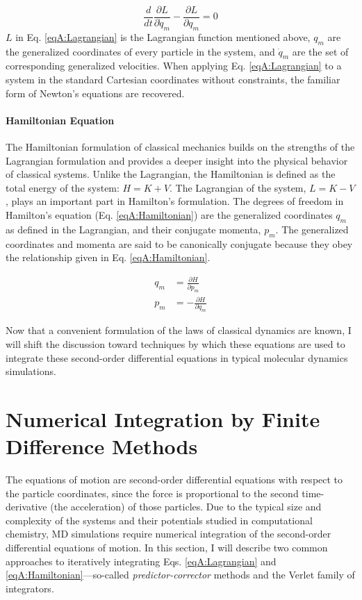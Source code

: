 \begin{equation}
   \frac d {dt} \frac {\partial L} {\partial \dot q_m} - \frac {\partial L}
         {\partial q_m} = 0
   \label{eqA:Lagrangian}
\end{equation}
$L$ in Eq. \ref{eqA:Lagrangian} is the Lagrangian function mentioned above,
$q_m$ are the generalized coordinates of every particle in the system, and $\dot
q_m$ are the set of corresponding generalized velocities. When applying Eq.
\ref{eqA:Lagrangian} to a system in the standard Cartesian coordinates without
constraints, the familiar form of Newton's equations are recovered.
\cite{CorbenClassicalMechanics}

\paragraph{Hamiltonian Equation}

The Hamiltonian formulation of classical mechanics builds on the strengths of
the Lagrangian formulation and provides a deeper insight into the physical
behavior of classical systems. Unlike the Lagrangian, the Hamiltonian is defined
as the total energy of the system: $H = K + V$. The Lagrangian of the system,
$L = K - V$, plays an important part in Hamilton's formulation. The degrees of
freedom in Hamilton's equation (Eq. \ref{eqA:Hamiltonian}) are the generalized
coordinates $q_m$ as defined in the Lagrangian, and their conjugate momenta,
$p_m$. The generalized coordinates and momenta are said to be canonically
conjugate because they obey the relationship given in Eq. \ref{eqA:Hamiltonian}.
\cite{CorbenClassicalMechanics}

\begin{align}
   q_m & = \frac {\partial H} {\partial p_m} \nonumber \\
   p_m & = - \frac {\partial H} {\partial q_m}
   \label{eqA:Hamiltonian}
\end{align}

Now that a convenient formulation of the laws of classical dynamics are known, I
will shift the discussion toward techniques by which these equations are used to
integrate these second-order differential equations in typical molecular
dynamics simulations.

\section{Numerical Integration by Finite Difference Methods}

The equations of motion are second-order differential equations with respect to
the particle coordinates, since the force is proportional to the second
time-derivative (\ie the acceleration) of those particles. Due to the typical
size and complexity of the systems and their potentials studied in computational
chemistry, MD simulations require numerical integration of the second-order
differential equations of motion. In this section, I will describe two common
approaches to iteratively integrating Eqs. \ref{eqA:Lagrangian} and
\ref{eqA:Hamiltonian}---so-called \emph{predictor-corrector} methods and the
Verlet family of integrators.

